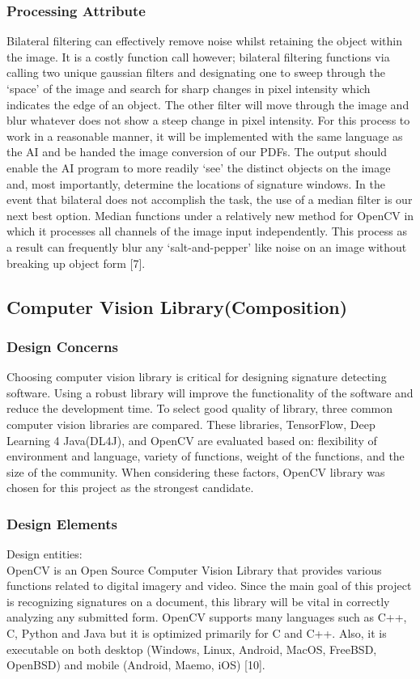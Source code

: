 \documentclass[onecolumn, draftclsnofoot,10pt, compsoc]{IEEEtran}
\begin{document}
\subsubsection{Processing Attribute}
Bilateral filtering can effectively remove noise whilst retaining the object within the image. It is a costly function call however; bilateral filtering functions via calling two unique gaussian filters and designating one to sweep through the ‘space’ of the image and search for sharp changes in pixel intensity which indicates the edge of an object. The other filter will move through the image and blur whatever does not show a steep change in pixel intensity. For this process to work in a reasonable manner, it will be implemented with the same language as the AI and be handed the image conversion of our PDFs. The output should enable the AI program to more readily ‘see’ the distinct objects on the image and, most importantly, determine the locations of signature windows. In the event that bilateral does not accomplish the task, the use of a median filter is our next best option. Median functions under a relatively new method for OpenCV in which it processes all channels of the image input independently. This process as a result can frequently blur any ‘salt-and-pepper’ like noise on an image without breaking up object form [7].

\subsection{Computer Vision Library(Composition)}
\subsubsection{Design Concerns}
Choosing computer vision library is critical for designing signature detecting software. Using a robust library will improve the functionality of the software and reduce the development time. To select good quality of library, three common computer vision libraries are compared. These libraries, TensorFlow, Deep Learning 4 Java(DL4J), and OpenCV are evaluated based on: flexibility of environment and language, variety of functions, weight of the functions, and the size of the community. When considering these factors, OpenCV library was chosen for this project as the strongest candidate.

\subsubsection{Design Elements}
Design entities: \\
OpenCV is an Open Source Computer Vision Library that provides various functions related to digital imagery and video. Since the main goal of this project is recognizing signatures on a document, this library will be vital in correctly analyzing any submitted form. OpenCV supports many languages such as C++, C, Python and Java but it is optimized primarily for C and C++.  Also, it is executable on both desktop (Windows, Linux, Android, MacOS, FreeBSD, OpenBSD) and mobile (Android, Maemo, iOS) [10].\\
\end{document}
